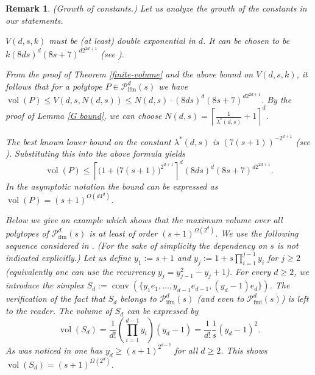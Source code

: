 \documentclass[a4paper]{article}
\theoremstyle{plain}
\newtheorem{remark}[nn]{Remark}
\begin{document}
\begin{remark} {\emph{({Growth of constants}.)}}
Let us analyze the growth of the constants in our
statements.

$V(d,s,k)$ must be (at least) double exponential in $d$.
It can be chosen to be $k (8ds)^d (8s+7)^{d 2^{2d+1}}$ (see
\cite{Pikhurko01}).

From the proof of Theorem \ref{finite-volume} and the above
bound on $V(d,s,k)$, it follows that for a polytope $P \in
{{\mathcal{P}}_{{\mathop{\mathrm{{ifm}}}}}^{{d}}({s})}$ we have ${{\mathop{\mathrm{{vol}}}}}(P) \le V(d,s,N(d,s)) \le N(d,s)
\cdot (8ds)^d (8s+7)^{d 2^{2d+1}}$.
By the proof of Lemma \ref{G bound}, we can choose
$N(d,s) = {\left\lceil{\frac{1}{\lambda^\ast(d,s)}+1}\right\rceil}^d$.

The best known lower bound on the constant
$\lambda^\ast(d,s)$ is $(7(s+1))^{-2^{d+1}}$ (see
\cite[Lemma\,2.1]{lagarias-ziegler-1991}).
Substituting this into the above formula yields
\begin{equation} \label{vol P upper}
{{\mathop{\mathrm{{vol}}}}}(P) \le {\left\lceil{(1 + \big(7(s+1)\big)^{2^{d+1}}}\right\rceil}^d
(8ds)^d (8s+7)^{d 2^{2d+1}}.
\end{equation}
In the asymptotic notation the bound can be expressed as
${{\mathop{\mathrm{{vol}}}}}(P) = (s+1)^{O(d 4^d)}$.

Below we give an example which shows that the maximum volume
over all polytopes of ${{\mathcal{P}}_{{\mathop{\mathrm{{ifm}}}}}^{{d}}({s})}$ is at least of order
$(s+1)^{\Omega(2^d)}$.
We use the following sequence considered in
\cite[Lemma~2.1]{lagarias-ziegler-1991}.
(For the sake of simplicity the dependency on $s$ is not
indicated explicitly.)
Let us define $y_1 := s + 1$ and $y_j := 1 + s
\prod_{i=1}^{j-1} y_i$ for $j \ge 2$ (equivalently one can
use the recurrency $y_j = y_{j-1}^2 - y_j + 1$).
For every $d \ge 2$, we introduce the simplex $S_d := {{\mathop{\mathrm{{conv}}}}}
(\{ y_1 e_1, \ldots,y_{d-1} e_{d-1}, (y_d-1) e_d\})$.
The verification of the fact that $S_d$ belongs to
${{\mathcal{P}}_{{\mathop{\mathrm{{ifm}}}}}^{{d}}({s})}$ (and even to ${{\mathcal{P}}_{{\mathop{\mathrm{{fmi}}}}}^{{d}}({s})}$) is left to the
reader.
The volume of $S_d$ can be expressed by
\begin{equation*}
  {{\mathop{\mathrm{{vol}}}}}(S_d) = \frac{1}{d!} \left(\prod_{i=1}^{d-1}
    y_i\right) (y_d-1) = \frac{1}{d!} \frac{1}{s}
  (y_d-1)^2.
\end{equation*}
As was noticed in \cite[p.~1026]{lagarias-ziegler-1991} one
has $y_d \ge (s+1)^{2^{d-2}}$ for all $d \ge 2$. This shows
${{\mathop{\mathrm{{vol}}}}}(S_d) = (s+1)^{\Omega(2^d)}$.

\end{remark}
\end{document}
